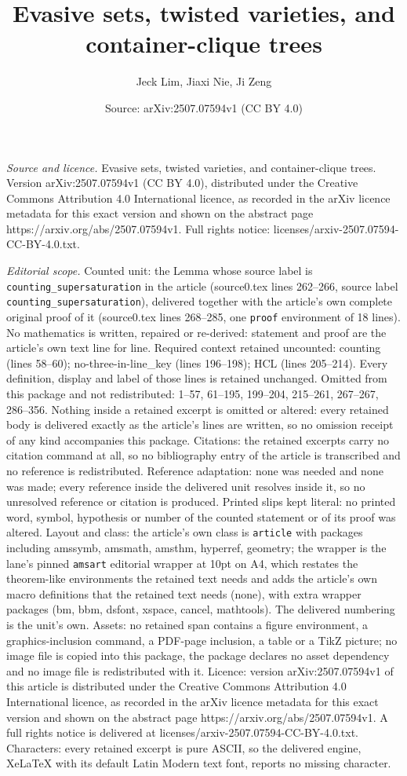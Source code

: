 \documentclass[10pt,a4paper]{amsart}
\title[Evasive sets, twisted varieties, and container-clique trees]{Evasive sets, twisted varieties, and container-clique trees}
\author{Jeck Lim, Jiaxi Nie, Ji Zeng}
\date{Source: arXiv:2507.07594v1 (CC BY 4.0)}
\begin{document}
\maketitle

\noindent\emph{Source and licence.} Evasive sets, twisted varieties, and container-clique trees. Version arXiv:2507.07594v1 (CC BY 4.0), distributed under the Creative Commons Attribution 4.0 International licence, as recorded in the arXiv licence metadata for this exact version and shown on the abstract page https://arxiv.org/abs/2507.07594v1. Full rights notice: licenses/arxiv-2507.07594-CC-BY-4.0.txt.\par\smallskip

\noindent\textit{Editorial scope.} Counted unit: the Lemma whose source label is \texttt{counting\_supersaturation} in the article (source0.tex lines 262--266, source label \texttt{counting\_supersaturation}), delivered together with the article's own complete original proof of it (source0.tex lines 268--285, one \texttt{proof} environment of 18 lines). No mathematics is written, repaired or re-derived: statement and proof are the article's own text line for line. Required context retained uncounted: counting (lines 58--60); no-three-in-line\_key (lines 196--198); HCL (lines 205--214). Every definition, display and label of those lines is retained unchanged. Omitted from this package and not redistributed: 1--57, 61--195, 199--204, 215--261, 267--267, 286--356. Nothing inside a retained excerpt is omitted or altered: every retained body is delivered exactly as the article's lines are written, so no omission receipt of any kind accompanies this package. Citations: the retained excerpts carry no citation command at all, so no bibliography entry of the article is transcribed and no reference is redistributed. Reference adaptation: none was needed and none was made; every reference inside the delivered unit resolves inside it, so no unresolved reference or citation is produced. Printed slips kept literal: no printed word, symbol, hypothesis or number of the counted statement or of its proof was altered. Layout and class: the article's own class is \texttt{article} with packages including amssymb, amsmath, amsthm, hyperref, geometry; the wrapper is the lane's pinned \texttt{amsart} editorial wrapper at 10pt on A4, which restates the theorem-like environments the retained text needs and adds the article's own macro definitions that the retained text needs (none), with extra wrapper packages (bm, bbm, dsfont, xspace, cancel, mathtools). The delivered numbering is the unit's own. Assets: no retained span contains a figure environment, a graphics-inclusion command, a PDF-page inclusion, a table or a TikZ picture; no image file is copied into this package, the package declares no asset dependency and no image file is redistributed with it. Licence: version arXiv:2507.07594v1 of this article is distributed under the Creative Commons Attribution 4.0 International licence, as recorded in the arXiv licence metadata for this exact version and shown on the abstract page https://arxiv.org/abs/2507.07594v1. A full rights notice is delivered at licenses/arxiv-2507.07594-CC-BY-4.0.txt. Characters: every retained excerpt is pure ASCII, so the delivered engine, XeLaTeX with its default Latin Modern text font, reports no missing character.
\end{document}
